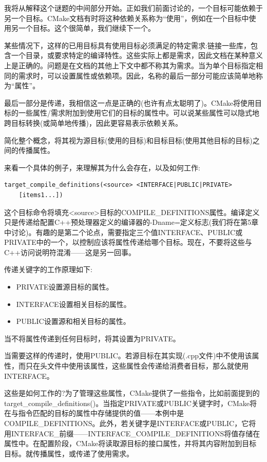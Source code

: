我将从解释这个谜题的中间部分开始。正如我们前面讨论的，一个目标可能依赖于另一个目标。CMake文档有时将这种依赖关系称为“使用”，例如在一个目标中使用另一个目标。这个很简单，我们继续下一个。

某些情况下，这样的已用目标具有使用目标必须满足的特定需求:链接一些库，包含一个目录，或要求特定的编译特性。这些实际上都是需求，因此文档在某种意义上是正确的。问题是在文档的其他上下文中都不称其为需求。当为单个目标指定相同的需求时，可以设置属性或依赖项。因此，名称的最后一部分可能应该简单地称为“属性”。

最后一部分是传递，我相信这一点是正确的(也许有点太聪明了)。CMake将使用目标的一些属性/需求附加到使用它们的目标的属性中。可以说某些属性可以隐式地跨目标转换(或简单地传播)，因此更容易表示依赖关系。

简化整个概念，将其视为源目标(使用的目标)和目标目标(使用其他目标的目标)之间的传播属性。

来看一个具体的例子，来理解其为什么会存在，以及如何工作:

\begin{lstlisting}[style=styleCMake]
target_compile_definitions(<source> <INTERFACE|PUBLIC|PRIVATE> 
	[items1...])
\end{lstlisting}

这个目标命令将填充<source>目标的COMPILE\_DEFINITIONS属性。编译定义只是传递给配置C++预处理器定义的编译器的-Dname=定义标志(我们将在第5章中讨论)。有趣的是第二个论点，需要指定三个值INTERFACE、PUBLIC或PRIVATE中的一个，以控制应该将属性传递给哪个目标。现在，不要将这些与C++访问说明符混淆——这是另一回事。

传递关键字的工作原理如下:

\begin{itemize}
\item 
PRIVATE设置源目标的属性。

\item 
INTERFACE设置相关目标的属性。

\item 
PUBLIC设置源和相关目标的属性。
\end{itemize}

当不将属性传递到任何目标时，将其设置为PRIVATE。

当需要这样的传递时，使用PUBLIC。若源目标在其实现(.cpp文件)中不使用该属性，而只在头文件中使用该属性，这些属性会传递给消费者目标，那么就使用INTERFACE。

这些是如何工作的?为了管理这些属性，CMake提供了一些指令，比如前面提到的target\_compile\_definitions()。当指定PRIVATE或PUBLIC关键字时，CMake将在与指令匹配的目标的属性中存储提供的值——本例中是COMPILE\_DEFINITIONS。此外，若关键字是INTERFACE或PUBLIC，它将用INTERFACE\_前缀——INTERFACE\_COMPILE\_DEFINITIONS将值存储在属性中。在配置阶段，CMake将读取源目标的接口属性，并将其内容附加到目标目标。就传播属性，或传递了使用需求。

